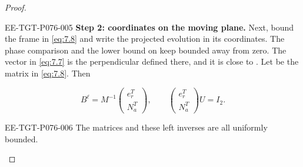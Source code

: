 \begin{proof}
\begin{EESegment}{EE-TGT-P076-005}
\textbf{Step 2: coordinates on the moving plane.}
Next, bound the frame in \eqref{eq:7.8} and write the projected evolution in its coordinates. The phase comparison and the lower bound on  keep  bounded away from zero. The vector  in \eqref{eq:7.7} is the perpendicular defined there, and it is close to . Let  be the  matrix in \eqref{eq:7.8}. Then
\end{EESegment}
\[
B^\ell=M^{-1}
\begin{pmatrix}e_r^T\\N_a^T\end{pmatrix},
\qquad
\begin{pmatrix}e_r^T\\N_a^T\end{pmatrix}U=I_2.
\]
\begin{EESegment}{EE-TGT-P076-006}
The matrices  and these left inverses are all uniformly bounded.
\end{EESegment}


\end{proof}
